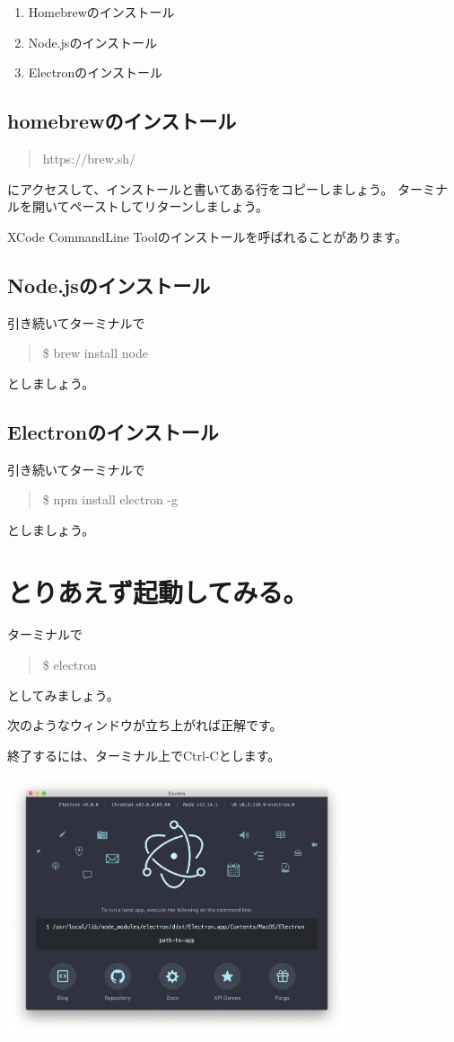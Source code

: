 \documentclass[mingoth,11pt,a4j,uplatex]{jsarticle}
\begin{document}
\begin{enumerate}
\item Homebrewのインストール
\item Node.jsのインストール
\item Electronのインストール
\end{enumerate}

\subsection{homebrewのインストール}
\begin{quote}
https://brew.sh/
\end{quote}
にアクセスして、インストールと書いてある行をコピーしましょう。
ターミナルを開いてペーストしてリターンしましょう。

XCode CommandLine Toolのインストールを呼ばれることがあります。
\subsection{Node.jsのインストール}
引き続いてターミナルで
\begin{quote}
\$ brew install node
\end{quote}
としましょう。

\subsection{Electronのインストール}
引き続いてターミナルで
\begin{quote}
\$ npm install electron -g
\end{quote}
としましょう。

\section{とりあえず起動してみる。}
ターミナルで
\begin{quote}
\$ electron
\end{quote}
としてみましょう。

次のようなウィンドウが立ち上がれば正解です。

終了するには、ターミナル上でCtrl-Cとします。

\includegraphics[width=10cm]{img/electron_default.png}
\end{document}
